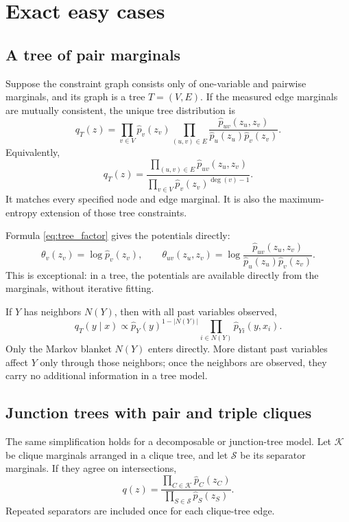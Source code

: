 \documentclass[11pt]{article}
\newcommand{\1}{\mathbf 1}
\newcommand{\hatp}{\widehat p}
\begin{document}
\section{Exact easy cases}

\subsection{A tree of pair marginals}

Suppose the constraint graph consists only of one-variable and pairwise
marginals, and its graph is a tree \(T=(V,E)\).  If the measured edge marginals
are mutually consistent, the unique tree distribution is
\begin{equation}
  q_T(z)
  =
  \prod_{v\in V}\hatp_v(z_v)
  \prod_{(u,v)\in E}
  \frac{\hatp_{uv}(z_u,z_v)}
       {\hatp_u(z_u)\hatp_v(z_v)}.
  \label{eq:tree_factor}
\end{equation}
Equivalently,
\[
  q_T(z)
  =
  \frac{\prod_{(u,v)\in E}\hatp_{uv}(z_u,z_v)}
       {\prod_{v\in V}\hatp_v(z_v)^{\deg(v)-1}}.
\]
It matches every specified node and edge marginal.  It is also the
maximum-entropy extension of those tree constraints.

Formula \eqref{eq:tree_factor} gives the potentials directly:
\[
  \theta_v(z_v)=\log\hatp_v(z_v),\qquad
  \theta_{uv}(z_u,z_v)
  =
  \log\frac{\hatp_{uv}(z_u,z_v)}
                {\hatp_u(z_u)\hatp_v(z_v)}.
\]
This is exceptional: in a tree, the potentials are available directly from the
marginals, without iterative fitting.

If \(Y\) has neighbors \(N(Y)\), then with all past variables observed,
\[
  q_T(y\mid x)
  \propto
  \hatp_Y(y)^{1-\lvert N(Y)\rvert}
  \prod_{i\in N(Y)}\hatp_{Yi}(y,x_i).
\]
Only the Markov blanket \(N(Y)\) enters directly.  More distant past variables
affect \(Y\) only through those neighbors; once the neighbors are observed,
they carry no additional information in a tree model.

\subsection{Junction trees with pair and triple cliques}

The same simplification holds for a decomposable or junction-tree model.  Let
\(\mathcal K\) be clique marginals arranged in a clique tree, and let
\(\mathcal S\) be its separator marginals.  If they agree on intersections,
\begin{equation}
  q(z)
  =
  \frac{\prod_{C\in\mathcal K}\hatp_C(z_C)}
       {\prod_{S\in\mathcal S}\hatp_S(z_S)}.
  \label{eq:junction_tree}
\end{equation}
Repeated separators are included once for each clique-tree edge.
\end{document}
